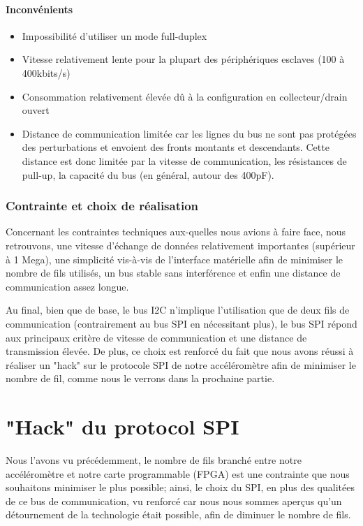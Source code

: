 \documentclass[french,a4paper,12pt]{report}
\begin{document}
  		\subsubsection{Inconvénients}
			\begin{itemize}
			\item Impossibilité d’utiliser un mode full-duplex 
			\item Vitesse relativement lente pour la plupart des périphériques esclaves (100 à 400kbits/s) 
			\item Consommation relativement élevée dû à la configuration en collecteur/drain ouvert 
			\item Distance de communication limitée car les lignes du bus ne sont pas protégées des perturbations et envoient des fronts montants et descendants. Cette distance est donc limitée par la vitesse de communication, les résistances de pull-up, la capacité du bus (en général, autour des 400pF).
\end{itemize}
 
 \subsection{Contrainte et choix de réalisation}
Concernant les contraintes techniques aux-quelles nous avions à faire face, nous retrouvons, une vitesse d'échange de données relativement importantes (supérieur à 1 Mega), une simplicité vis-à-vis de l'interface matérielle afin de minimiser le nombre de fils utilisés, un bus stable sans interférence et enfin une distance de communication assez longue.

Au final, bien que de base, le bus I2C n'implique l'utilisation que de deux fils de communication (contrairement au bus SPI en nécessitant plus), le bus SPI répond aux principaux critère de vitesse de communication et une distance de transmission élevée. De plus, ce choix est renforcé du fait que nous avons réussi à réaliser un "hack" sur le protocole SPI de notre accéléromètre afin de minimiser le nombre de fil, comme nous le verrons dans la prochaine partie.


\chapter{"Hack" du protocol SPI}
	Nous l'avons vu précédemment, le nombre de fils branché entre notre accéléromètre et notre carte programmable (FPGA) est une contrainte que nous souhaitons minimiser le plus possible; ainsi, le choix du SPI, en plus des qualitées de ce bus de communication, vu renforcé car nous nous sommes aperçus qu'un détournement de la technologie était possible, afin de diminuer le nombre de fils.
	
\end{document}
